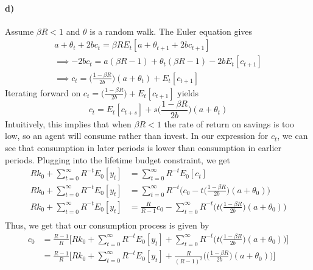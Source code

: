 \documentclass[12pt,letter]{article}
\begin{document}
\paragraph{d)} Assume $\beta R < 1$  and $\theta$ is a random walk. The Euler equation gives
\begin{equation}
\begin{split}
	a + \theta_t + 2bc_t = \beta R E_t\left[a + \theta_{t+1} + 2b c_{t+1}\right]\\
	\implies -2bc_t = a(\beta R -1) + \theta_t(\beta R -1) - 2bE_t\left[c_{t+1}\right]\\
	\implies c_t = \bigg(\frac{1-\beta R}{2b}\bigg)(a + \theta_{t}) + E_t\left[c_{t+1}\right]
	\end{split}
\end{equation}
Iterating forward on $ c_t = \bigg(\frac{1-\beta R}{2b}\bigg) + E_t\left[c_{t+1}\right]$ yields 
\begin{equation}
	c_t = E_t\left[c_{t+s}\right] + s\bigg(\frac{1-\beta R}{2b}\bigg)(a + \theta_{t})
\end{equation}
Intuitively, this implies that when $\beta R < 1$ the rate of return on savings is too low, so an agent will consume rather than invest. In our expression for $c_t$, we can see that consumption in later periods is lower than consumption in earlier periods. Plugging into the lifetime budget constraint, we get
\begin{equation*}
\begin{split}
	Rk_0 + \sum_{t = 0}^{\infty}R^{-t}E_0\left[y_t\right] &= \sum_{t = 0}^{\infty}R^{-t}E_0\left[c_t\right]\\
	Rk_0  + \sum_{t = 0}^{\infty}R^{-t}E_0\left[y_t\right] &= \sum_{t = 0}^{\infty}R^{-t}\bigg(c_0 - t \bigg(\frac{1-\beta R}{2b}\bigg)(a + \theta_0)\bigg)\\
	Rk_0  + \sum_{t = 0}^{\infty}R^{-t}E_0\left[y_t\right] &= \frac{R}{R-1}c_0 - \sum_{t = 0}^{\infty}R^{-t}\bigg(t \bigg(\frac{1-\beta R}{2b}\bigg)(a + \theta_0)\bigg)\\
\end{split}
\end{equation*}
Thus, we get that our consumption process is given by
\begin{equation}
\begin{split}
	c_0 &= \frac{R-1}{R} \bigg[Rk_0  + \sum_{t = 0}^{\infty}R^{-t}E_0\left[y_t\right] + \sum_{t = 0}^{\infty}R^{-t}\bigg(t \bigg(\frac{1-\beta R}{2b}\bigg)(a + \theta_0)\bigg)\bigg]\\&= \frac{R-1}{R} \bigg[Rk_0  + \sum_{t = 0}^{\infty}R^{-t}E_0\left[y_t\right] + \frac{R}{(R-1)^2}\bigg( \bigg(\frac{1-\beta R}{2b}\bigg)(a + \theta_0)\bigg)\bigg]
\end{split}
\end{equation}
\end{document}
